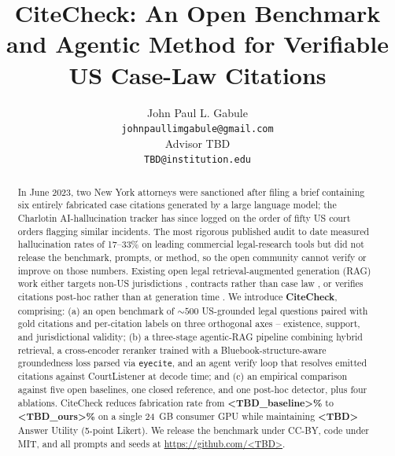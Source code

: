 \documentclass[11pt]{article}
\title{CiteCheck: An Open Benchmark and Agentic Method for
       Verifiable US Case-Law Citations}
\author{John Paul L. Gabule \\
  \texttt{johnpaullimgabule@gmail.com} \\
  \And
  Advisor TBD \\
  \texttt{TBD@institution.edu} \\}
\begin{document}
\maketitle

\begin{abstract}
In June 2023, two New York attorneys were sanctioned after filing a
brief containing six entirely fabricated case citations generated by a
large language model; the Charlotin AI-hallucination tracker has since
logged on the order of fifty US court orders flagging similar
incidents. The most rigorous published audit to date
\citep{magesh2025hallucination} measured hallucination rates of
17--33\% on leading commercial legal-research tools but did not
release the benchmark, prompts, or method, so the open community
cannot verify or improve on those numbers. Existing open legal
retrieval-augmented generation (RAG) work either targets non-US
jurisdictions \citep{wankhade2026elrag}, contracts rather than case
law \citep{pipitone2024legalbenchrag,butler2025mleb}, or verifies
citations post-hoc rather than at generation time
\citep{noel2025hallugraph,choi2025citeguard}. We introduce
\textbf{CiteCheck}, comprising: (a) an open benchmark of
${\sim}500$ US-grounded legal questions paired with gold citations and
per-citation labels on three orthogonal axes -- existence, support,
and jurisdictional validity; (b) a three-stage agentic-RAG pipeline
combining hybrid retrieval, a cross-encoder reranker trained with a
Bluebook-structure-aware groundedness loss parsed via \texttt{eyecite},
and an agent verify loop that resolves emitted citations against
CourtListener at decode time; and (c) an empirical comparison against
five open baselines, one closed reference, and one post-hoc detector,
plus four ablations. CiteCheck reduces fabrication rate from
\textbf{<TBD\_baseline>\%} to \textbf{<TBD\_ours>\%} on a single 24~GB
consumer GPU while maintaining \textbf{<TBD>} Answer Utility (5-point
Likert). We release the benchmark under CC-BY, code under MIT, and all
prompts and seeds at \url{https://github.com/<TBD>}.
\end{abstract}

\end{document}
